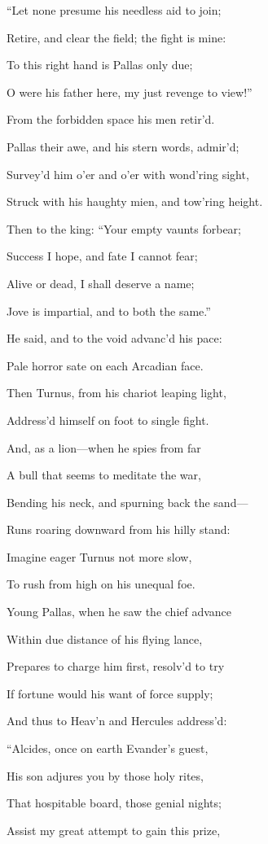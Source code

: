 “Let none presume his needless aid to join;

Retire, and clear the field; the fight is mine:

To this right hand is Pallas only due;

O were his father here, my just revenge to view!”

From the forbidden space his men retir’d.

Pallas their awe, and his stern words, admir’d;

Survey’d him o’er and o’er with wond’ring sight,

Struck with his haughty mien, and tow’ring height.

Then to the king: “Your empty vaunts forbear;

Success I hope, and fate I cannot fear;

Alive or dead, I shall deserve a name;

Jove is impartial, and to both the same.”

He said, and to the void advanc’d his pace:

Pale horror sate on each Arcadian face.

Then Turnus, from his chariot leaping light,

Address’d himself on foot to single fight.

And, as a lion—when he spies from far

A bull that seems to meditate the war,

Bending his neck, and spurning back the sand—

Runs roaring downward from his hilly stand:

Imagine eager Turnus not more slow,

To rush from high on his unequal foe.

Young Pallas, when he saw the chief advance

Within due distance of his flying lance,

Prepares to charge him first, resolv’d to try

If fortune would his want of force supply;

And thus to Heav’n and Hercules address’d:

“Alcides, once on earth Evander’s guest,

His son adjures you by those holy rites,

That hospitable board, those genial nights;

Assist my great attempt to gain this prize,

